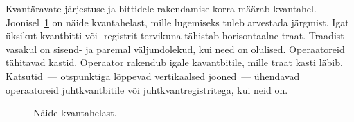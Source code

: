 \documentclass[12pt]{report}
\def\ket#1{\left|#1\right>}
\def\SWAP{\mathop{\rm SWAP}\nolimits}
\begin{document}
\begin{table}[]
    \caption{Töös kasutatud operaatorid, nende definitsioonid maatriksitena ja tähistused ahelas.}
    \label{tab:gates}
\end{table}

Kvantäravate järjestuse ja bittidele rakendamise korra määrab kvantahel.
Joonisel~\ref{fig:circuits} on näide kvantahelast, mille lugemiseks tuleb arvestada järgmist.
Igat üksikut kvantbitti või -registrit tervikuna tähistab horisontaalne traat.
Traadist vasakul on sisend- ja paremal väljundolekud, kui need on olulised.
Operaatoreid tähitavad kastid.
Operaator rakendub igale kavantbitile, mille traat kasti läbib.
Katsutid~--- otspunktiga lõppevad vertikaalsed jooned~--- ühendavad operaatoreid juhtkvantbitile või juhtkvantregistritega, kui neid on.

\begin{figure}
    \centering
    \ifdefined\yquanton
    \fi
    \caption{Näide kvantahelast.}
    \label{fig:circuits}
\end{figure}
\end{document}
